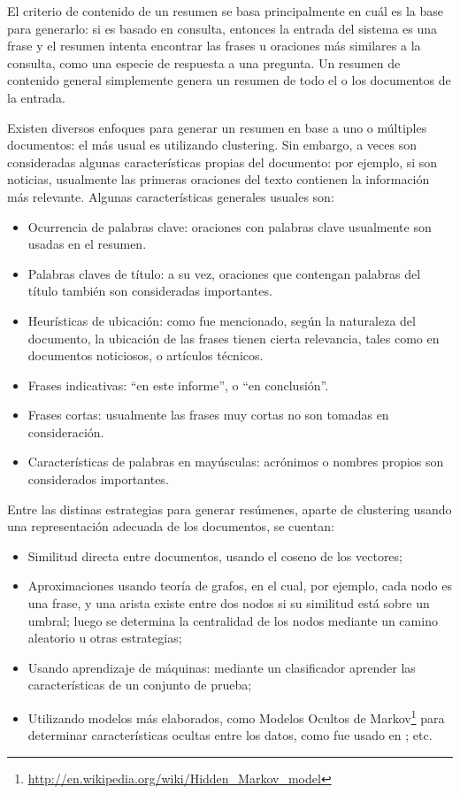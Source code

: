    El criterio de contenido de un resumen se basa principalmente en
   cuál es la base para generarlo: si es basado en consulta, entonces
   la entrada del sistema es una frase y el resumen intenta encontrar
   las frases u oraciones más similares a la consulta, como una
   especie de respuesta a una pregunta. Un resumen de contenido
   general simplemente genera un resumen de todo el o los documentos
   de la entrada.

   Existen diversos enfoques para generar un resumen en base a uno o
   múltiples documentos: el más usual es utilizando clustering. Sin
   embargo, a veces son consideradas algunas características propias
   del documento: por ejemplo, si son noticias, usualmente las
   primeras oraciones del texto contienen la información más
   relevante\cite{DBLP:conf:spire:Bravo-MarquezM12}. Algunas
   características generales usuales son:

\begin{itemize}
\item Ocurrencia de palabras clave: oraciones con palabras
     clave usualmente son usadas en el resumen.
\item Palabras claves de título: a su vez, oraciones que contengan
     palabras del título también son consideradas importantes.
\item Heurísticas de ubicación: como fue mencionado, según la
     naturaleza del documento, la ubicación de las frases tienen
     cierta relevancia, tales como en documentos noticiosos, o
     artículos técnicos.
\item Frases indicativas: ``en este informe'', o ``en conclusión''.
\item Frases cortas: usualmente las frases muy cortas no son tomadas en
     consideración.
\item Características de palabras en mayúsculas: acrónimos o nombres
     propios son considerados importantes.
\end{itemize}
   Entre las distinas estrategias para generar resúmenes, aparte de
   clustering usando una representación adecuada de los documentos, se
   cuentan:

\begin{itemize}
\item Similitud directa entre documentos, usando el coseno de los
     vectores;
\item Aproximaciones usando teoría de grafos, en el cual, por ejemplo,
     cada nodo es una frase, y una arista existe entre dos nodos si su
     similitud está sobre un umbral; luego se determina la centralidad
     de los nodos mediante un camino aleatorio u otras estrategias;
\item Usando aprendizaje de máquinas: mediante un clasificador aprender
     las características de un conjunto de prueba;
\item Utilizando modelos más elaborados, como Modelos Ocultos de
     Markov\footnote{\href{http://en.wikipedia.org/wiki/Hidden\_Markov\_model}{http://en.wikipedia.org/wiki/Hidden\_Markov\_model} }
     para determinar características ocultas entre los datos, como fue
     usado en \cite{chakrabarti2011event}; etc.
\end{itemize}

